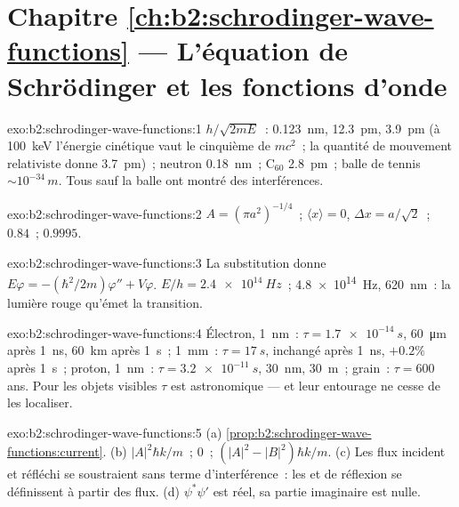 \section*{Chapitre \ref{ch:b2:schrodinger-wave-functions} --- L'équation de Schrödinger et les fonctions d'onde}

\begin{solution}{exo:b2:schrodinger-wave-functions:1}
$h/\sqrt{2mE}$~: \qty{0.123}{nm}, \qty{12.3}{pm}, \qty{3.9}{pm} (à \qty{100}{keV}
l'énergie cinétique vaut le cinquième de $mc^2$~; la quantité de mouvement relativiste donne
\qty{3.7}{pm})~; neutron \qty{0.18}{nm}~; C$_{60}$ \qty{2.8}{pm}~; balle de tennis
$\sim 10^{-34}\,\unit{m}$. Tous sauf la balle ont montré des interférences.
\end{solution}

\begin{solution}{exo:b2:schrodinger-wave-functions:2}
$A = (\pi a^2)^{-1/4}$~; $\langle x\rangle = 0$, $\Delta x = a/\sqrt2$~; $0.84$~; $0.9995$.
\end{solution}

\begin{solution}{exo:b2:schrodinger-wave-functions:3}
La substitution donne $E\varphi = -(\hbar^2/2m)\varphi'' + V\varphi$. $E/h =
\qty{2.4e14}{Hz}$~; \qty{4.8e14}{Hz}, \qty{620}{nm}~: la lumière rouge qu'émet la
transition.
\end{solution}

\begin{solution}{exo:b2:schrodinger-wave-functions:4}
Électron, \qty{1}{nm}~: $\tau = \qty{1.7e-14}{s}$, \qty{60}{\micro m} après \qty{1}{ns},
\qty{60}{km} après \qty{1}{s}~; \qty{1}{mm}~: $\tau = \qty{17}{s}$, inchangé après \qty{1}{ns},
$+0.2\%$ après \qty{1}{s}~; proton, \qty{1}{nm}~: $\tau = \qty{3.2e-11}{s}$, \qty{30}{nm},
\qty{30}{m}~; grain~: $\tau = 600$ ans. Pour les objets visibles $\tau$ est
astronomique --- et leur entourage ne cesse de les localiser.
\end{solution}

\begin{solution}{exo:b2:schrodinger-wave-functions:5}
(a) \cref{prop:b2:schrodinger-wave-functions:current}. (b) $|A|^2\hbar k/m$~;
$0$~; $(|A|^2 - |B|^2)\hbar k/m$. (c) Les flux incident et réfléchi se
soustraient sans terme d'interférence~: les  et de réflexion
se définissent à partir des flux. (d) $\psi^*\psi'$ est réel, sa
partie imaginaire est nulle.
\end{solution}

